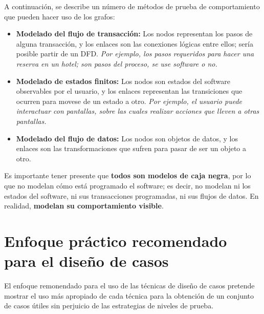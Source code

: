 A continuación, se describe un número de métodos de prueba de comportamiento que pueden hacer uso de los grafos:

\begin{itemize}
    \item \textbf{Modelado del flujo de transacción:} Los nodos representan los pasos de alguna transacción, y los enlaces son las conexiones lógicas entre ellos; sería posible partir de un DFD. \textit{Por ejemplo, los pasos requeridos para hacer una reserva en un hotel; son pasos del proceso, se use software o no.}
    \item \textbf{Modelado de estados finitos:} Los nodos son estados del software observables por el usuario, y los enlaces representan las transiciones que ocurren para movese de un estado a otro. \textit{Por ejemplo, el usuario puede interactuar con pantallas, sobre las cuales realizar acciones que lleven a otras pantallas.}
    \item \textbf{Modelado del flujo de datos:} Los nodos son objetos de datos, y los enlaces son las transformaciones que sufren para pasar de ser un objeto a otro.
\end{itemize}

Es importante tener presente que \textbf{todos son modelos de caja negra}, por lo que no modelan cómo está programado el software; es decir, no modelan ni los estados del software, ni sus transacciones programadas, ni sus flujos de datos. En realidad, \textbf{modelan su comportamiento visible}.


\section{Enfoque práctico recomendado para el diseño de casos}

El enfoque remonendado para el uso de las técnicas de diseño de casos pretende mostrar el uso más apropiado de cada técnica para la obtención de un conjunto de casos útiles sin perjuicio de las estrategias de niveles de prueba.

